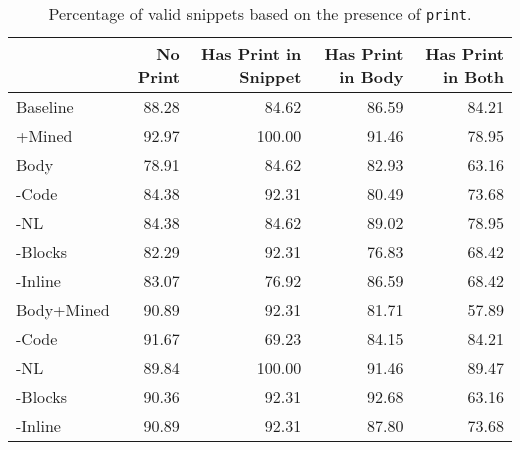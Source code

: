 \documentclass[11pt]{article}
\newcommand{\codesnip}[1]{\small\texttt{#1}\normalsize}
\newcommand*{\tableind}{\hspace*{0.5cm}}\newcommand{\thincross}{\textrm{\ding{61}}}
\begin{document}
\begin{table*}[h!]
    \centering
     \begin{tabular}{l|rrrr}
        \toprule
          &  No Print &  Has Print in Snippet &  Has Print in Body &  Has Print in Both \\
        \hline
        Baseline &     88.28 &                 84.62 &              86.59 &              84.21 \\
        \tableind +Mined  &     92.97 &                100.00 &              91.46 &              78.95 \\
        \hline
        Body  &     78.91 &                 84.62 &              82.93 &              63.16 \\
        \tableind -Code &     84.38 &                 92.31 &              80.49 &              73.68 \\
        \tableind -NL &     84.38 &                 84.62 &              89.02 &              78.95 \\
        \tableind -Blocks &     82.29 &                 92.31 &              76.83 &              68.42 \\
        \tableind -Inline &     83.07 &                 76.92 &              86.59 &              68.42 \\
        \hline
        Body+Mined &     90.89 &                 92.31 &              81.71 &              57.89 \\
        \tableind -Code &     91.67 &                 69.23 &              84.15 &              84.21 \\
        \tableind -NL &     89.84 &                100.00 &              91.46 &              89.47 \\
        \tableind -Blocks &     90.36 &                 92.31 &              92.68 &              63.16 \\
        \tableind -Inline &     90.89 &                 92.31 &              87.80 &              73.68 \\
\bottomrule
    \end{tabular}
    \caption{Percentage of valid snippets based on the presence of \codesnip{print}.}
    \label{tab:pctprint}
\end{table*}

\newpage
\end{document}

